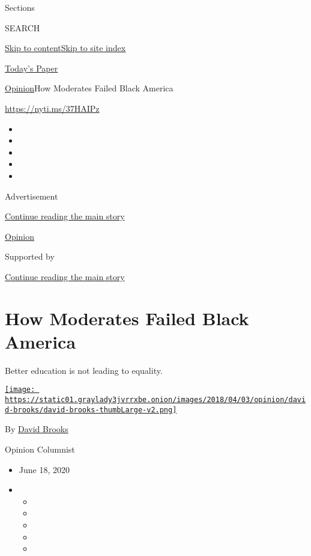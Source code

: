 Sections

SEARCH

\protect\hyperlink{site-content}{Skip to
content}\protect\hyperlink{site-index}{Skip to site index}

\href{https://myaccount.nytimes3xbfgragh.onion/auth/login?response_type=cookie\&client_id=vi}{}

\href{https://www.nytimes3xbfgragh.onion/section/todayspaper}{Today's
Paper}

\href{/section/opinion}{Opinion}\textbar{}How Moderates Failed Black
America

\url{https://nyti.ms/37HAIPz}

\begin{itemize}
\item
\item
\item
\item
\item
\end{itemize}

Advertisement

\protect\hyperlink{after-top}{Continue reading the main story}

\href{/section/opinion}{Opinion}

Supported by

\protect\hyperlink{after-sponsor}{Continue reading the main story}

\hypertarget{how-moderates-failed-black-america}{%
\section{How Moderates Failed Black
America}\label{how-moderates-failed-black-america}}

Better education is not leading to equality.

\href{https://www.nytimes3xbfgragh.onion/by/david-brooks}{\texttt{[image: https://static01.graylady3jvrrxbe.onion/images/2018/04/03/opinion/david-brooks/david-brooks-thumbLarge-v2.png]}}

By \href{https://www.nytimes3xbfgragh.onion/by/david-brooks}{David
Brooks}

Opinion Columnist

\begin{itemize}
\item
  June 18, 2020
\item
  \begin{itemize}
  \item
  \item
  \item
  \item
  \item
  \end{itemize}
\end{itemize}


